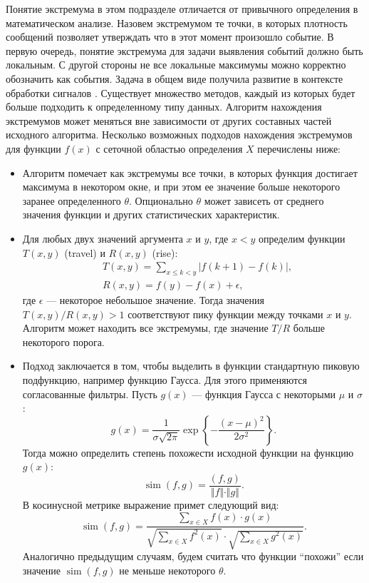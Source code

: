 \documentclass[12pt, a4paper]{article}
\DeclareMathOperator{\simu}{sim}
\begin{document}
  Понятие экстремума в этом подразделе отличается от привычного определения в математическом анализе. Назовем экстремумом те точки, в которых плотность сообщений позволяет утверждать что в этот момент произошло событие. В первую очередь, понятие экстремума для задачи выявления событий должно быть локальным. С другой стороны не все локальные максимумы можно корректно обозначить как события. Задача в общем виде получила развитие в контексте обработки сигналов \cite{peak-detection}. Существует множество методов, каждый из которых будет больше подходить к определенному типу данных. Алгоритм нахождения экстремумов может меняться вне зависимости от других составных частей исходного алгоритма. Несколько возможных подходов нахождения экстремумов для функции $f(x)$ с сеточной областью определения $X$ перечислены ниже:
  \begin{itemize}
	\item  
	Алгоритм помечает как экстремумы все точки, в которых функция достигает максимума в некотором окне, и при этом ее значение больше некоторого заранее определенного $\theta$. Опционально $\theta$ может зависеть от среднего значения функции и других статистических характеристик.
	\item
  	Для любых двух значений аргумента $x$ и $y$, где $x < y$ определим функции $T(x,y)$ (travel) и $R(x,y)$ (rise):
  	\begin{equation}
  	\begin{aligned}
	  	& T(x, y) = \sum_{x \leq k < y} \left\vert f(k + 1) - f(k) \right\vert, \\
	  	& R(x, y) = f(y) - f(x) + \epsilon,
	\end{aligned}
  	\end{equation}
  	где $\epsilon$ --- некоторое небольшое значение. Тогда значения $T(x, y)/R(x, y)>1$ соответствуют пику функции между точками $x$ и $y$. Алгоритм может находить все экстремумы, где значение $T/R$ больше некоторого порога.
  	
  	\item
  	Подход заключается в том, чтобы выделить в функции стандартную пиковую подфункцию, например функцию Гаусса. Для этого применяются согласованные фильтры. Пусть $g(x)$ --- функция Гаусса с некоторыми $\mu$ и $\sigma$:
\begin{equation}
  	g(x) = \frac{1}{\sigma \sqrt{2\pi}} \exp\left\{ -\frac{(x-\mu)^2}{2 \sigma^2} \right\}.
  	\end{equation}  	
  	Тогда можно определить степень похожести исходной функции на функцию $g(x)$:
  	\begin{equation}
  	\simu(f,g) = \frac{\left(f,g\right)}{\Vert f \Vert \cdot \Vert g \Vert}.
  	\end{equation}
  	В косинусной метрике выражение примет следующий вид:
  	\begin{equation}
  	\simu(f,g) = \frac{\sum\limits_{x \in X} f(x) \cdot g(x)}{\sqrt{\sum\limits_{x \in X}^{\,} f^2(x)} \cdot \sqrt{\sum\limits_{x \in X}^{\,} g^2(x)}}.
  	\end{equation}
  	Аналогично предыдущим случаям, будем считать что функции ``похожи'' если значение $\simu(f,g)$ не меньше некоторого $\theta$.
  	

\end{itemize}
\end{document}
